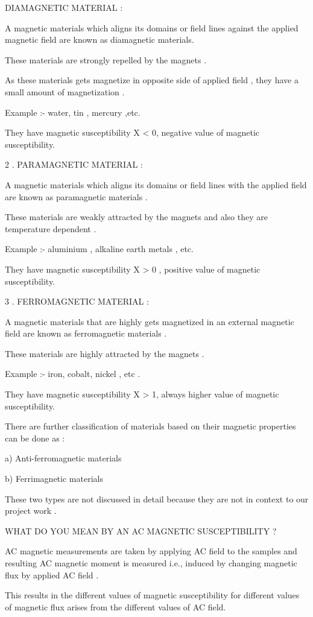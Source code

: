 DIAMAGNETIC MATERIAL :

A magnetic materials which aligns its domains or field lines against the applied magnetic field are known as diamagnetic materials.

These materials are strongly repelled by the magnets .

As these materials gets magnetize in opposite side of applied field , they have a small amount of magnetization .

Example :- water, tin , mercury ,etc.

They have magnetic susceptibility Χ < 0,
negative value of magnetic 
susceptibility.

          2 .  PARAMAGNETIC MATERIAL :

A magnetic materials which aligns its domains or field lines with the applied field are known as paramagnetic materials .

These materials are weakly attracted by the magnets and also they are temperature dependent .

Example :- aluminium , alkaline earth metals , etc.

They have magnetic susceptibility Χ > 0 , positive value of magnetic 
susceptibility.

            3 .  FERROMAGNETIC MATERIAL :

A magnetic materials that are highly gets magnetized in an external magnetic field are known as ferromagnetic materials .

These materials are highly attracted by the magnets .

Example :- iron, cobalt, nickel , etc .

They have magnetic susceptibility Χ > 1, always higher value of magnetic susceptibility.
 
There are further classification of materials based on their magnetic properties can be done as :

a) Anti-ferromagnetic materials 

b) Ferrimagnetic materials 

These two types are not discussed in detail because they are not in context to our project work .

WHAT DO YOU MEAN BY AN AC MAGNETIC SUSCEPTIBILITY ?

AC magnetic measurements are taken by applying AC field to the samples and resulting AC magnetic moment is measured i.e.,
induced by changing magnetic flux by applied AC field .

This results in the different values of magnetic susceptibility for different values of magnetic flux arises from the different values of AC field.

